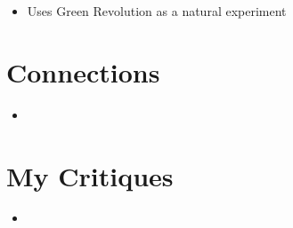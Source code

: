 \documentclass[12pt]{article}
\begin{document}
\begin{itemize}[leftmargin=*, itemsep=4pt]
    \item Uses Green Revolution as a natural experiment
\end{itemize}


\section{Connections}

\begin{itemize}
    \item
\end{itemize}


\section{My Critiques}

\begin{itemize}
    \item
\end{itemize}
\end{document}
